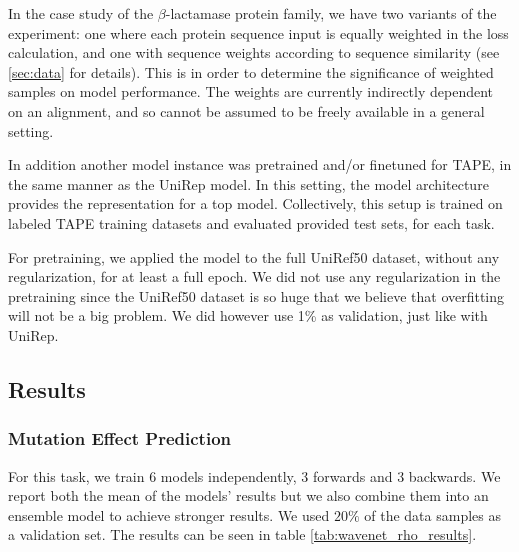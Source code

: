 In the case study of the $\beta$-lactamase protein family, we have two variants of the experiment: one where each protein sequence input is equally weighted in the loss calculation, and one with sequence weights according to sequence similarity (see \ref{sec:data} for details). This is in order to determine the significance of weighted samples on model performance. The weights are currently indirectly dependent on an alignment, and so cannot be assumed to be freely available in a general setting.

In addition another model instance was pretrained and/or finetuned for TAPE, in the same manner as the UniRep model. In this setting, the model architecture provides the representation for a top model. Collectively, this setup is trained on labeled TAPE training datasets and evaluated provided test sets, for each task.

For pretraining, we applied the model to the full UniRef50 dataset, without any regularization, for at least a full epoch. We did not use any regularization in the pretraining since the UniRef50 dataset is so huge that we believe that overfitting will not be a big problem. We did however use 1\% as validation, just like with UniRep.

\subsection{Results}

\subsubsection{Mutation Effect Prediction}
For this task, we train 6 models independently, 3 forwards and 3 backwards. We report both the mean of the models' results but we also combine them into an ensemble model to achieve stronger results. We used $20\%$ of the data samples as a validation set. The results can be seen in table \ref{tab:wavenet_rho_results}.



